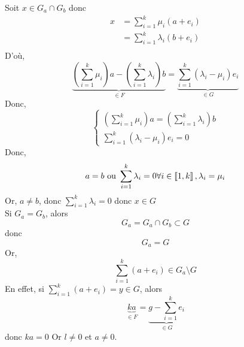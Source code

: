 \begin{enumerate}
		Soit $x \in G_a \cap G_b$ donc
		\begin{align*}
			x &= \sum_{i=1}^k \mu_i (a + e_i)\\
			&= \sum_{i=1}^k \lambda_i (b + e_i) \\
		\end{align*}
		D'où, \[
			\underbrace{\left(\sum_{i=1}^k \mu_i \right)a - \left(\sum_{i=1}^k \lambda_i \right)b}_{\in F} = \underbrace{\sum_{i=1}^k (\lambda_i - \mu_i) e_i}_{\in G}
		\] Donc, \[
			\begin{cases}
				\left( \sum_{i=1}^k \mu_i \right)a = \left( \sum_{i=1}^k \lambda_i \right) b\\
				\sum_{i=1}^k (\lambda_i - \mu_i) e_i = 0
			\end{cases}
		\] Donc, \[
			a = b \text{ ou } \sum_{i=1}^k \lambda_i = 0\\
			\forall i \in \left\llbracket 1,k \right\rrbracket, \lambda_i = \mu_i
		\] Or, $a \neq b$, donc $\sum_{i=1}^k \lambda_i = 0$ donc $x \in G$\\
		Si $G_a = G_b$, alors \[
			G_a = G_a \cap G_b \subset G
		\] donc  \[
			G_a = G
		\] Or, \[
			\sum_{i=1}^k (a+ e_i) \in G_a \setminus G
		\] En effet, si $\sum_{i=1}^k (a+ e_i) = y \in G$, alors  \[
			\underbrace{ka}_{\in F} = \underbrace{g-  \sum_{i=1}^k e_i}_{\in G}
		\]donc $ka = 0$ Or $l \neq 0$ et $a \neq 0$.
\end{enumerate}

